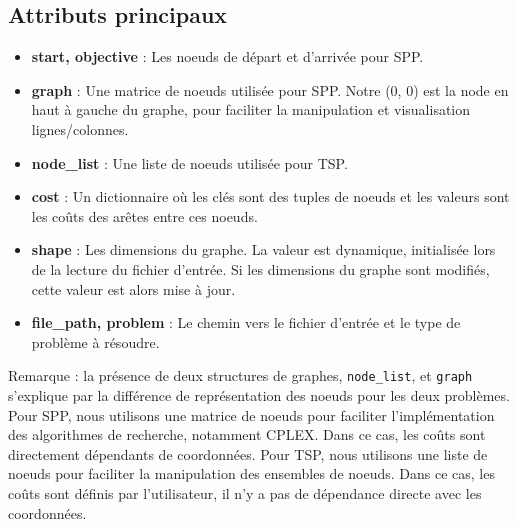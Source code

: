 \subsection{Attributs principaux}
\begin{itemize}
    \item \textbf{start, objective} : Les noeuds de départ et d'arrivée pour \ac{SPP}.
    \item \textbf{graph} : Une matrice de noeuds utilisée pour \ac{SPP}. Notre (0, 0) est la node en haut à gauche du graphe, pour faciliter la manipulation et visualisation lignes/colonnes.
    \item \textbf{node\_list} : Une liste de noeuds utilisée pour \ac{TSP}.
    \item \textbf{cost} : Un dictionnaire où les clés sont des tuples de noeuds et les valeurs sont les coûts des arêtes entre ces noeuds.
    \item \textbf{shape} : Les dimensions du graphe. La valeur est dynamique, initialisée lors de la lecture du fichier d'entrée. Si les dimensions du graphe sont modifiés, cette valeur est alors mise à jour.
    \item \textbf{file\_path, problem} : Le chemin vers le fichier d'entrée et le type de problème à résoudre.
\end{itemize}

Remarque : la présence de deux structures de graphes, \texttt{node\_list}, et \texttt{graph} s'explique par la différence de représentation des noeuds pour les deux problèmes. Pour \ac{SPP}, nous utilisons une matrice de noeuds pour faciliter l'implémentation des algorithmes de recherche, notamment CPLEX. Dans ce cas, les coûts sont directement dépendants de coordonnées. Pour \ac{TSP}, nous utilisons une liste de noeuds pour faciliter la manipulation des ensembles de noeuds. Dans ce cas, les coûts sont définis par l'utilisateur, il n'y a pas de dépendance directe avec les coordonnées.


